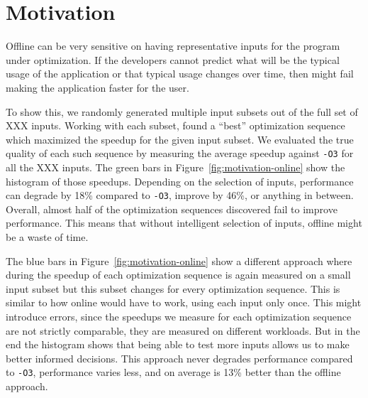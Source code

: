 \section{Motivation}

Offline \itercomp can be very sensitive on having representative inputs for the program under optimization. If the
developers cannot predict what will be the typical usage of the application or that typical usage changes over time,
then \itercomp might fail making the application faster for the user.

To show this, we randomly generated multiple
input subsets out of the full set of XXX inputs. Working with each subset, \itercomp found a ``best'' optimization
sequence which maximized the speedup for the given input subset. We evaluated the true quality of each such sequence
by measuring the average speedup against \texttt{-O3} for all the XXX inputs. The green bars in
Figure~\ref{fig:motivation-online} show the histogram of those speedups. Depending on the selection of inputs,
performance can degrade by 18\% compared to \texttt{-O3}, improve by 46\%, or anything in between. Overall, almost half
of the optimization sequences discovered fail to improve performance. This means that without intelligent selection of
inputs, offline \itercomp might be a waste of time.

The blue bars in Figure~\ref{fig:motivation-online} show a different approach where during \itercomp the speedup of each optimization
sequence is again measured on a small input subset but this subset changes for every optimization sequence. This is similar to how online
\itercomp would have to work, using each input only once. This might introduce errors, since the speedups we measure for each optimization
sequence are not strictly comparable, they are measured on different workloads. But in the end the histogram shows that being able to test
more inputs allows us to make better informed decisions. This approach never degrades performance compared to \texttt{-O3}, performance
varies less, and on average is 13\% better than the offline approach.


